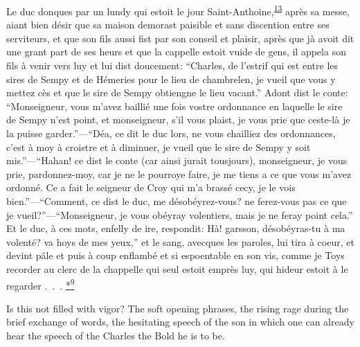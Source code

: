 Le duc donques par un lundy qui estoit le jour
Saint-Anthoine,\textsuperscript{\protect\hypertarget{21_Chapter_Thirteen__IMAGE_AND_WORD.xhtmlux5cux23id_283}{\protect\hyperlink{23_NOTES.xhtmlux5cux23id_284}{13}}}
après sa messe, aiant bien désir que sa maison demorast paisible et sans
discention entre ses serviteurs, et que son fils aussi fist par son
conseil et plaisir, après que jà avoit dit une grant part de ses heurs
et que la cappelle estoit vuide de gens, il appela son fils à venir vers
luy et lui dist doucement: ``Charles, de l'estrif qui est entre les
sires de Sempy et de Hémeries pour le lieu de chambrelen, je vueil que
vous y mettez cès et que le sire de Sempy obtiengne le lieu vacant.''
Adont dist le conte: ``Monseigneur, vous m'avez baillié une fois vostre
ordonnance en laquelle le sire de Sempy n'est point, et monseigneur,
s'il vous plaist, je vous prie que ceste-là je la puisse
garder.''---``Déa, ce dit le duc lors, ne vous chailliez des
ordonnances, c'est à moy à croistre et à diminuer, je vueil que le sire
de Sempy y soit mis.''---``Hahan! ce dist le conte (car ainsi jurait
tousjours), monseigneur, je vous prie, pardonnez-moy, car je ne le
\protect\hypertarget{21_Chapter_Thirteen__IMAGE_AND_WORD.xhtmlux5cux23page_344}{}{}pourroye
faire, je me tiens a ce que vous m'avez ordonné. Ce a fait le seigneur
de Croy qui m'a brassé cecy, je le vois bien.''---``Comment, ce dist le
duc, me désobéyrez-vous? ne ferez-vous pas ce que je
vueil?''---``Monseigneur, je vous obéyray volentiers, mais je ne feray
point cela.'' Et le duc, à ces mots, enfelly de ire, respondit: Hà!
garsson, désobéyras-tu à ma volenté? va hoys de mes yeux,'' et le sang,
avecques les paroles, lui tira à coeur, et devint pâle et puis à coup
enflambé et si espoentable en son vis, comme je Toys recorder au clerc
de la chappelle qui seul estoit emprès luy, qui hideur estoit à le
regarder .~.~.
\protect\hypertarget{21_Chapter_Thirteen__IMAGE_AND_WORD.xhtmlux5cux23id_2363}{\protect\hyperlink{23_NOTES.xhtmlux5cux23id_2364}{*\textsuperscript{9}}}

Is this not filled with vigor? The soft opening phrases, the rising rage
during the brief exchange of words, the hesitating speech of the son in
which one can already hear the speech of the Charles the Bold he is to
be.

